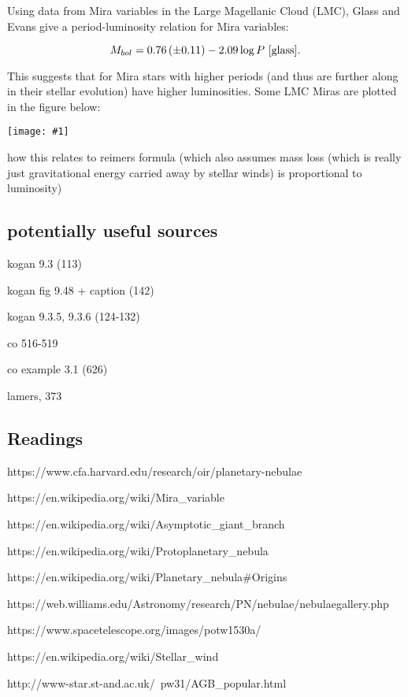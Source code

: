 \documentclass[a4paper,11pt,twocolumn]{article}
\newcommand{\fig}[1]{\centerline{\texttt{[image: \#1]}}}
\begin{document}
Using data from Mira variables in the Large Magellanic Cloud (LMC), Glass and Evans give a period-luminosity relation for Mira variables: 

\begin{equation*}
    M_{bol} = 0.76\,(\pm 0.11) - 2.09\log P~\text{\cite{glass}}.
\end{equation*}

This suggests that for Mira stars with higher periods (and thus are further along in their stellar evolution) have higher luminosities. Some LMC Miras are plotted in the figure below:

\vspace{0.2cm}
\fig{period_luminosity}

{\huge how this relates to reimers formula (which also assumes mass loss (which is really just gravitational energy carried away by stellar winds) is proportional to luminosity)}

\subsection{potentially useful sources}
kogan 9.3 (113)

kogan fig 9.48 + caption (142)

kogan 9.3.5, 9.3.6 (124-132)

co 516-519

co example 3.1 (626)

lamers, 373


\subsection{Readings}

https://www.cfa.harvard.edu/research/oir/planetary-nebulae

https://en.wikipedia.org/wiki/Mira_variable

https://en.wikipedia.org/wiki/Asymptotic_giant_branch

https://en.wikipedia.org/wiki/Protoplanetary_nebula

https://en.wikipedia.org/wiki/Planetary_nebula#Origins

https://web.williams.edu/Astronomy/research/PN/nebulae/nebulaegallery.php

https://www.spacetelescope.org/images/potw1530a/

https://en.wikipedia.org/wiki/Stellar_wind

http://www-star.st-and.ac.uk/~pw31/AGB_popular.html
\end{document}
